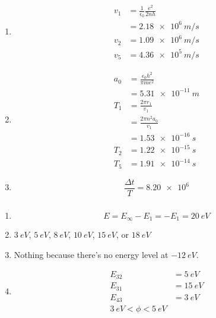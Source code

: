 \documentclass{article}
\begin{document}
\begin{enumerate}
  \item

        \begin{align*}
          v_1 & = \frac{1}{\epsilon_0} \frac{e^2}{2 n h} \\
              & = \qty{2.18e6}{m/s}                      \\
          v_2 & = \qty{1.09e6}{m/s}                      \\
          v_5 & = \qty{4.36e5}{m/s}
        \end{align*}

  \item

        \begin{align*}
          a_0 & = \frac{\epsilon_0 h^2}{\pi m e^2} \\
              & = \qty{5.31e-11}{m}                \\
          T_1 & = \frac{2 \pi r_1}{v_1}            \\
              & = \frac{2 \pi n^2 a_0}{v_1}        \\
              & = \qty{1.53e-16}{s}                \\
          T_2 & = \qty{1.22e-15}{s}                \\
          T_5 & = \qty{1.91e-14}{s}
        \end{align*}

  \item \[\frac{\Delta t}{T} = \num{8.20e6}\]
\end{enumerate}

\setcounter{subsubsection}{24}
\subsubsection{}

\begin{enumerate}
  \item \[E = E_\infty - E_1 = -E_1 = \qty{20}{eV}\]

  \item $\qty{3}{eV}$, $\qty{5}{eV}$, $\qty{8}{eV}$, $\qty{10}{eV}$, $\qty{15}{eV}$, or $\qty{18}{eV}$

  \item Nothing because there's no energy level at $\qty{-12}{eV}$.

  \item

        \begin{align*}
          E_{32} & = \qty{5}{eV}  \\
          E_{31} & = \qty{15}{eV} \\
          E_{43} & = \qty{3}{eV}  \\
          \qty{3}{eV} < \phi < \qty{5}{eV}
        \end{align*}
\end{enumerate}
\end{document}
